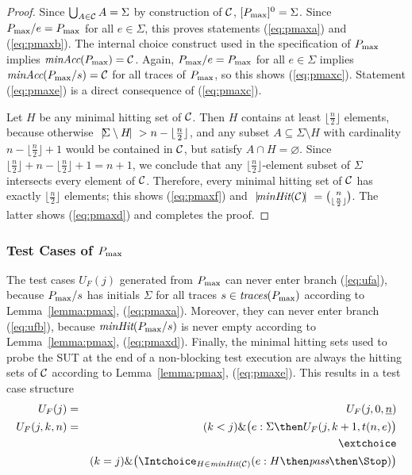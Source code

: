 \begin{proof}
 Since  
$
\bigcup_{A\in{\cal C}} A = \Sigma
$
by construction of ${\cal C}$, $[P_\text{max}]^0 = \Sigma$. Since $P_\text{max}/e = P_\text{max}$ for all
$e\in\Sigma$, this proves statements (\ref{eq:pmaxa}) and (\ref{eq:pmaxb}).
The internal choice construct used in the specification of $P_\text{max}$ implies
$\text{\it minAcc}(P_\text{max}) = {\cal C}$. Again, $P_\text{max}/e = P_\text{max}$ for all
$e\in\Sigma$ implies $\text{\it minAcc}(P_\text{max}/s) = {\cal C}$ for all traces of $P_\text{max}$, so this shows (\ref{eq:pmaxc}). Statement (\ref{eq:pmaxe}) is a direct consequence
of (\ref{eq:pmaxc}).

Let $H$ be any minimal hitting set of ${\cal C}$. Then
$H$ contains at least $\lfloor{\frac{n}{2}}\rfloor$ elements, because
otherwise ${~|\! \Sigma\setminus H\!|~} > n-\lfloor{\frac{n}{2}}\rfloor$, and any
subset $A\subseteq \Sigma\setminus H$ with cardinality
$n-\lfloor{\frac{n}{2}}\rfloor+1$  would be contained in ${\cal C}$, but satisfy
$A\cap H=\varnothing$. Since
$\lfloor{\frac{n}{2}}\rfloor+n-\lfloor{\frac{n}{2}}\rfloor+1=n+1$, we
conclude
 that any $\lfloor{\frac{n}{2}}\rfloor$-element subset of $\Sigma$
 intersects  every element of ${\cal C}$.  Therefore, every minimal hitting set of ${\cal C}$ has exactly $\lfloor{\frac{n}{2}}\rfloor$ elements; this shows (\ref{eq:pmaxf})
and ${~|\! \text{\it minHit}({\cal C})\!|~} = \binom{n}{\lfloor{\frac{n}{2}}\rfloor}$. The latter 
shows  (\ref{eq:pmaxd}) and completes the proof.
\xbox
\end{proof}

\subsubsection*{Test Cases of $P_\text{max}$}
The test cases $U_F(j)$ generated from $P_\text{max}$ 
can never enter branch (\ref{eq:ufa}), because $P_\text{max}/s$ has initials $\Sigma$ for
all traces $s\in\text{\it traces}(P_\text{max})$ according to Lemma~\ref{lemma:pmax}, (\ref{eq:pmaxa}).
Moreover, they can never enter branch (\ref{eq:ufb}), because $\text{\it minHit}(P_\text{max}/s)$
is never empty according to Lemma~\ref{lemma:pmax}, (\ref{eq:pmaxd}).
Finally, the minimal hitting sets used to probe the SUT at the end of a
non-blocking  test execution are always the hitting sets of ${\cal C}$ 
according to Lemma~\ref{lemma:pmax}, (\ref{eq:pmaxe}).
This results in a test case structure
\begin{eqnarray*}
\label{eq:UFPpmax}
U_F(j) & = & U_F(j,0,\ii n)
\\
U_F(j,k,n) & = &   (k < j) \& \big(e:\Sigma   \then U_F(j,k+1,t(n,e) \big)
\\ & & \extchoice  
\\ & & (k = j) \& \big( \Intchoice_{H\in\minhits({\cal C})} (e:H   \then \epass \then\Stop   )  \big)
\end{eqnarray*}



